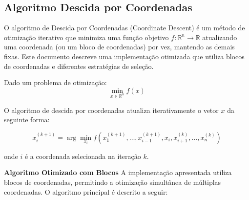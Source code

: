 \documentclass[12pt,a4paper]{article}
\begin{document}
\newpage
\subsection{Algoritmo Descida por Coordenadas}

O algoritmo de Descida por Coordenadas (Coordinate Descent) é um método de otimização iterativo que minimiza uma função objetivo $f: \mathbb{R}^n \rightarrow \mathbb{R}$ atualizando uma coordenada (ou um bloco de coordenadas) por vez, mantendo as demais fixas. Este documento descreve uma implementação otimizada que utiliza blocos de coordenadas e diferentes estratégias de seleção.


Dado um problema de otimização:
\begin{equation}
\min_{x \in \mathbb{R}^n} f(x)
\end{equation}

O algoritmo de descida por coordenadas atualiza iterativamente o vetor $x$ da seguinte forma:

\begin{equation}
x^{(k+1)}_i = \arg\min_{x_i} f(x_1^{(k+1)}, \ldots, x_{i-1}^{(k+1)}, x_i, x_{i+1}^{(k)}, \ldots, x_n^{(k)})
\end{equation}

onde $i$ é a coordenada selecionada na iteração $k$.

\vspace{1cm}
\textbf{Algoritmo Otimizado com Blocos}
\vspace{1cm}
A implementação apresentada utiliza blocos de coordenadas, permitindo a otimização simultânea de múltiplas coordenadas. O algoritmo principal é descrito a seguir:
\end{document}
